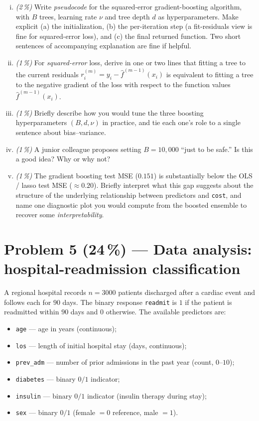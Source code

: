 \documentclass[11pt,a4paper]{article}
\newcommand{\points}[1]{\textbf{(#1\,\%)}}
\newcommand{\subpoints}[1]{\textit{(#1\,\%)}}
\begin{document}
\begin{enumerate}[(i)]
  \item \subpoints{2} Write \emph{pseudocode} for the squared-error gradient-boosting algorithm, with $B$ trees, learning rate $\nu$ and tree depth $d$ as hyperparameters. Make explicit (a) the initialization, (b) the per-iteration step (a fit-residuals view is fine for squared-error loss), and (c) the final returned function. Two short sentences of accompanying explanation are fine if helpful.
  \item \subpoints{1} For \emph{squared-error} loss, derive in one or two lines that fitting a tree to the current residuals $r^{(m)}_i = y_i - \hat f^{(m-1)}(x_i)$ is equivalent to fitting a tree to the negative gradient of the loss with respect to the function values $\hat f^{(m-1)}(x_i)$.
  \item \subpoints{1} Briefly describe how you would tune the three boosting hyperparameters $(B, d, \nu)$ in practice, and tie each one's role to a single sentence about bias--variance.
  \item \subpoints{1} A junior colleague proposes setting $B = 10{,}000$ ``just to be safe.'' Is this a good idea? Why or why not?
  \item \subpoints{1} The gradient boosting test MSE ($0.151$) is substantially below the OLS / lasso test MSE ($\approx 0.20$). Briefly interpret what this gap suggests about the structure of the underlying relationship between predictors and \texttt{cost}, and name one diagnostic plot you would compute from the boosted ensemble to recover some \emph{interpretability}.
\end{enumerate}

\vfill\eject

\section*{Problem 5 \points{24} --- Data analysis: hospital-readmission classification}

A regional hospital records $n = 3000$ patients discharged after a cardiac event and follows each for $90$ days. The binary response \texttt{readmit} is $1$ if the patient is readmitted within $90$ days and $0$ otherwise. The available predictors are:
\begin{itemize}
  \item \texttt{age} --- age in years (continuous);
  \item \texttt{los} --- length of initial hospital stay (days, continuous);
  \item \texttt{prev\_adm} --- number of prior admissions in the past year (count, $0$--$10$);
  \item \texttt{diabetes} --- binary $0/1$ indicator;
  \item \texttt{insulin} --- binary $0/1$ indicator (insulin therapy during stay);
  \item \texttt{sex} --- binary $0/1$ (female $= 0$ reference, male $= 1$).
\end{itemize}
\end{document}
